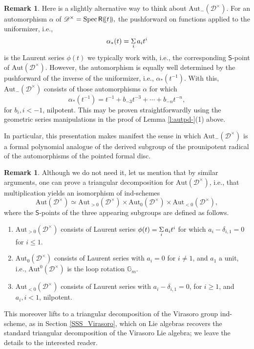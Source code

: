 \documentclass{amsart}
\theoremstyle{definition}
\newtheorem{Rem}[Thm]{Remark}
\newcommand{\Spec}{\on{Spec}\hspace{.5mm}}
\newcommand{\sD}{\mathscr{D}}
\newcommand{\Sing}{\mathsf{S}}
\newcommand{\on}{\mathrm}
\newcommand{\Ring}{\mathsf{R}}
\newcommand{\Am}{\Aut_-(\pD)}
\newcommand{\pD}{\sD^\times}
\newcommand{\Aut}{\on{Aut}}
\numberwithin{equation}{section}
\begin{document}
\begin{Rem}\label{r:rightmovers} Here is a slightly alternative way to think about $\Am$. For an automorphism $\alpha$ of $\pD = \Spec \Ring(\!(t)\!),$ the pushforward on functions applied to the uniformizer, i.e.,  $$\alpha_*(t) = \underset{i}\Sigma \hspace{.5mm} a_i t^i$$is the Laurent series $\phi(t)$ we typically work with, i.e., the corresponding $\Sing$-point of $\Aut(\pD)$. However, the automorphism is equally well determined by the pushforward of the inverse of the uniformizer, i.e., $\alpha_*(t^{-1})$. With this, $\Am$ consists of those automorphisms $\alpha$ for which 
$$\alpha_*(t^{-1}) = t^{-1} + b_{-3}t^{-3} + \cdots + b_{-n}t^{-n},$$
for $b_i, i < -1$, nilpotent. This may be proven straightforwardly using the geometric series manipulations in the proof of Lemma \ref{l:autpd-}(1) above. 

In particular, this presentation makes manifest the sense in which $\Am$ is a formal polynomial analogue of the derived subgroup of the prounipotent radical of the automorphisms of the pointed formal disc.
\end{Rem}

\begin{Rem}Although we do not need it, let us mention that by similar arguments, one can prove a triangular decomposition for $\Aut(\pD)$, i.e., that multiplication yields an isomorphism of ind-schemes $$\Aut(\pD) \simeq \Aut_{>0}(\pD) \times \Aut_0(\pD) \times \Aut_{<0}(\pD),$$where the $\Sing$-points of the three appearing subgroups are defined as follows. \begin{enumerate}  \item $\Aut_{> 0}(\pD)$ consists of Laurent series $\phi(t) = \underset{i}\Sigma \hspace{.5mm} a_it^i$ for which $a_i - \delta_{i,1} = 0$ for $i \leqslant 1$.

\item $\Aut_0(\pD)$ consists of Laurent series with $a_i = 0$ for $i \neq 1$, and $a_1$ a unit, i.e., $\Aut^0(\pD)$ is the loop rotation $\mathbb{G}_m$.

\item $\Aut_{<0}(\pD)$ consists of Laurent series with $a_i  - \delta_{i,1} = 0$, for $i \geqslant 1$, and $a_i, i < 1$, nilpotent. 

\end{enumerate}
This moreover lifts to a triangular decomposition of the Virasoro group ind-scheme, as in Section \ref{SSS_Virasoro}, which on Lie algebras recovers the standard triangular decomposition of the Virasoro Lie algebra; we leave the details to the interested reader. 
\end{Rem}
\end{document}
